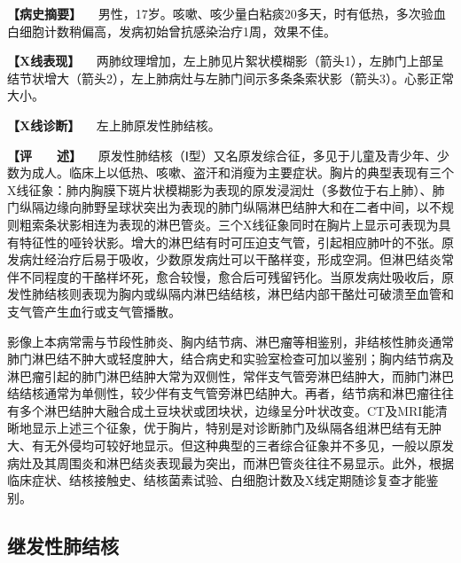 \textbf{【病史摘要】}
　男性，17岁。咳嗽、咳少量白粘痰20多天，时有低热，多次验血白细胞计数稍偏高，发病初始曾抗感染治疗1周，效果不佳。

\textbf{【X线表现】}
　两肺纹理增加，左上肺见片絮状模糊影（箭头1），左肺门上部呈结节状增大（箭头2），左上肺病灶与左肺门间示多条条索状影（箭头3）。心影正常大小。

\textbf{【X线诊断】} 　左上肺原发性肺结核。

\textbf{【评　　述】}
　原发性肺结核（Ⅰ型）又名原发综合征，多见于儿童及青少年、少数为成人。临床上以低热、咳嗽、盗汗和消瘦为主要症状。胸片的典型表现有三个X线征象：肺内胸膜下斑片状模糊影为表现的原发浸润灶（多数位于右上肺）、肺门纵隔边缘向肺野呈球状突出为表现的肺门纵隔淋巴结肿大和在二者中间，以不规则粗索条状影相连为表现的淋巴管炎。三个X线征象同时在胸片上显示可表现为具有特征性的哑铃状影。增大的淋巴结有时可压迫支气管，引起相应肺叶的不张。原发病灶经治疗后易于吸收，少数原发病灶可以干酪样变，形成空洞。但淋巴结炎常伴不同程度的干酪样坏死，愈合较慢，愈合后可残留钙化。当原发病灶吸收后，原发性肺结核则表现为胸内或纵隔内淋巴结结核，淋巴结内部干酪灶可破溃至血管和支气管产生血行或支气管播散。

影像上本病常需与节段性肺炎、胸内结节病、淋巴瘤等相鉴别，非结核性肺炎通常肺门淋巴结不肿大或轻度肿大，结合病史和实验室检查可加以鉴别；胸内结节病及淋巴瘤引起的肺门淋巴结肿大常为双侧性，常伴支气管旁淋巴结肿大，而肺门淋巴结结核通常为单侧性，较少伴有支气管旁淋巴结肿大。再者，结节病和淋巴瘤往往有多个淋巴结肿大融合成土豆块状或团块状，边缘呈分叶状改变。CT及MRI能清晰地显示上述三个征象，优于胸片，特别是对诊断肺门及纵隔各组淋巴结有无肿大、有无外侵均可较好地显示。但这种典型的三者综合征象并不多见，一般以原发病灶及其周围炎和淋巴结炎表现最为突出，而淋巴管炎往往不易显示。此外，根据临床症状、结核接触史、结核菌素试验、白细胞计数及X线定期随诊复查才能鉴别。

\subsection{继发性肺结核}


